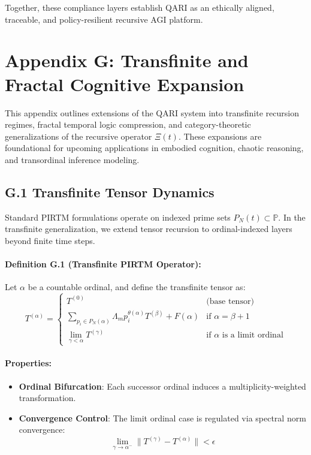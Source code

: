 \documentclass[12pt]{article}
\begin{document}
\begin{itemize}
\noindent
Together, these compliance layers establish QARI as an ethically aligned, traceable, and policy-resilient recursive AGI platform.

\section*{Appendix G: Transfinite and Fractal Cognitive Expansion}

This appendix outlines extensions of the QARI system into transfinite recursion regimes, fractal temporal logic compression, and category-theoretic generalizations of the recursive operator \( \Xi(t) \). These expansions are foundational for upcoming applications in embodied cognition, chaotic reasoning, and transordinal inference modeling.

\subsection*{G.1 Transfinite Tensor Dynamics}

Standard PIRTM formulations operate on indexed prime sets \( P_N(t) \subset \mathbb{P} \). In the transfinite generalization, we extend tensor recursion to ordinal-indexed layers beyond finite time steps.

\paragraph{Definition G.1 (Transfinite PIRTM Operator):}
Let \( \alpha \) be a countable ordinal, and define the transfinite tensor as:
\[
T^{(\alpha)} = \begin{cases}
T^{(0)} & \text{(base tensor)} \\
\sum_{p_i \in P_N(\alpha)} \Lambda_m p_i^{\theta(\alpha)} T^{(\beta)} + F(\alpha) & \text{if } \alpha = \beta + 1 \\
\lim_{\gamma < \alpha} T^{(\gamma)} & \text{if } \alpha \text{ is a limit ordinal}
\end{cases}
\]

\paragraph{Properties:}
\begin{itemize}
    \item \textbf{Ordinal Bifurcation}: Each successor ordinal induces a multiplicity-weighted transformation.
    \item \textbf{Convergence Control}: The limit ordinal case is regulated via spectral norm convergence:
    \[
    \lim_{\gamma \to \alpha^{-}} \| T^{(\gamma)} - T^{(\alpha)} \| < \epsilon
    \]
\end{itemize}


\end{itemize}
\end{document}

